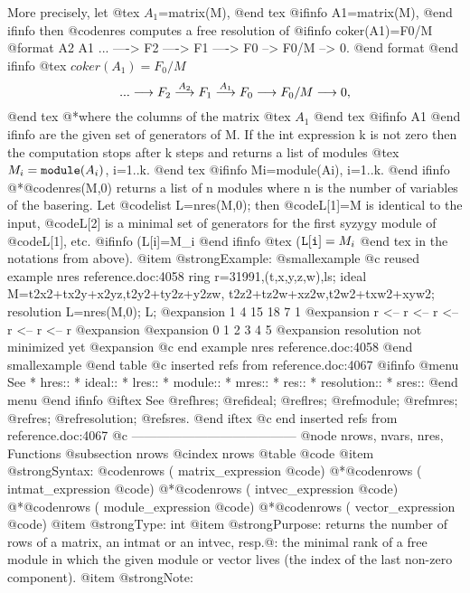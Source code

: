 {More precisely, let
@tex
$A_1$=matrix(M),
@end tex
@ifinfo
A1=matrix(M),
@end ifinfo
then @code{nres} computes a free resolution of
@ifinfo
coker(A1)=F0/M
@format
                    A2       A1
      ... ----> F2 ----> F1 ----> F0 --> F0/M --> 0.
@end format
@end ifinfo
@tex
$coker(A_1)=F_0/M$
$$...\longrightarrow F_2 \buildrel{A_2}\over{\longrightarrow} F_1 \buildrel{A_1}\over{\longrightarrow} F_0\longrightarrow F_0/M\longrightarrow 0,$$
@end tex
@*where the columns of the matrix
@tex
$A_1$
@end tex
@ifinfo
A1
@end ifinfo
are the given set of generators of M.
If the int expression k is not zero then the computation stops after k steps
and returns a list of modules
@tex
$M_i={\tt module}(A_i)$, i=1..k.
@end tex
@ifinfo
Mi=module(Ai), i=1..k.
@end ifinfo
@*@code{nres(M,0)} returns a list of n modules where n is the number of
variables of the basering.
Let @code{list L=nres(M,0);} then @code{L[1]=M} is identical to the input,
@code{L[2]} is a minimal set of generators for the first syzygy
module of  @code{L[1]}, etc.
@ifinfo
(L[i]=M_i
@end ifinfo
@tex
(${\tt L[i]}=M_i$
@end tex
in the notations from above).
@item @strong{Example:}
@smallexample
@c reused example nres reference.doc:4058 
  ring r=31991,(t,x,y,z,w),ls;
  ideal M=t2x2+tx2y+x2yz,t2y2+ty2z+y2zw,
          t2z2+tz2w+xz2w,t2w2+txw2+xyw2;
  resolution L=nres(M,0);
  L;
@expansion{}  1      4      15      18      7      1      
@expansion{} r <--  r <--  r <--   r <--   r <--  r
@expansion{} 
@expansion{} 0      1      2       3       4      5      
@expansion{} resolution not minimized yet
@expansion{} 
@c end example nres reference.doc:4058
@end smallexample
@end table
@c inserted refs from reference.doc:4067
@ifinfo
@menu
See
* hres::
* ideal::
* lres::
* module::
* mres::
* res::
* resolution::
* sres::
@end menu
@end ifinfo
@iftex
See
@ref{hres};
@ref{ideal};
@ref{lres};
@ref{module};
@ref{mres};
@ref{res};
@ref{resolution};
@ref{sres}.
@end iftex
@c end inserted refs from reference.doc:4067
@c ---------------------------------------
@node nrows, nvars, nres, Functions
@subsection nrows
@cindex nrows
@table @code
@item @strong{Syntax:}
@code{nrows (} matrix_expression @code{)}
@*@code{nrows (} intmat_expression @code{)}
@*@code{nrows (} intvec_expression @code{)}
@*@code{nrows (} module_expression @code{)}
@*@code{nrows (} vector_expression @code{)}
@item @strong{Type:}
int
@item @strong{Purpose:}
returns the number of rows of a matrix, an intmat or an intvec, resp.@:
the minimal rank of a free module in which the given module or
vector lives (the index of the last non-zero component).
@item @strong{Note:}
}
